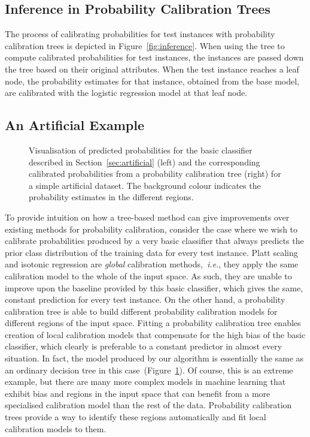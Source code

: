 \documentclass[wcp]{jmlr}
\begin{document}
\subsection{Inference in Probability Calibration Trees}

The process of calibrating probabilities for test instances with probability calibration trees is depicted in Figure~\ref{fig:inference}. When using the tree to compute calibrated probabilities for test instances, the instances are passed down the tree based on their original attributes. When the test instance reaches a leaf node, the probability estimates for that instance, obtained from the base model, are calibrated with the logistic regression model at that leaf node.

\subsection{\label{sec:artificial}An Artificial Example}

\begin{figure}[t]
	\centering
		{
		\setlength{\fboxsep}{0pt}%
		\setlength{\fboxrule}{1pt}%
         \quad
    	}
    \caption{\label{fig:motivation} Visualisation of predicted probabilities for the basic classifier described in Section~\ref{sec:artificial} (left) and the corresponding calibrated probabilities from a probability calibration tree (right) for a simple artificial dataset. The background colour indicates the probability estimates in the different regions.}
\end{figure}

To provide intuition on how a tree-based method can give improvements over existing methods for probability calibration, consider the case where we wish to calibrate probabilities produced by  a very basic classifier that always predicts the prior class distribution of the training data for every test instance. Platt scaling and isotonic regression are \textit{global} calibration methods,~\textit{i.e.}, they apply the same calibration model to the whole of the input space. As such, they are unable to improve upon the baseline provided by this basic classifier, which gives the same, constant prediction for every test instance. On the other hand, a probability calibration tree is able to build different probability calibration models for different regions of the input space. Fitting a probability calibration tree enables creation of local calibration models that compensate for the high bias of the basic classifier, which clearly is preferable to a constant predictor in almost every situation. In fact, the model produced by our algorithm is essentially the same as an ordinary decision tree in this case~(Figure~\ref{fig:motivation}). Of course, this is an extreme example, but there are many more complex models in machine learning that exhibit bias and regions in the input space that can benefit from a more specialised calibration model than the rest of the data. Probability calibration trees provide a way to identify these regions automatically and fit local calibration models to them. 
\end{document}
